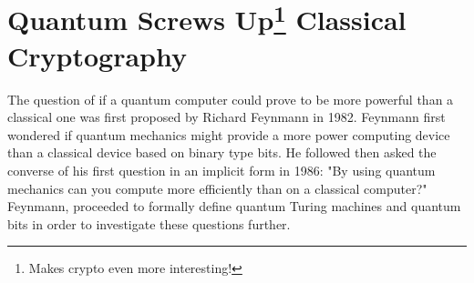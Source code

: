 \section{Quantum Screws Up\footnote{Makes crypto even more interesting!} Classical Cryptography} 


The question of if a quantum computer could prove to be more powerful than a classical one was first proposed by Richard Feynmann in 1982. Feynmann first wondered if quantum mechanics might provide a more power computing device than a classical device based on binary type bits. He followed then asked the converse of his first question in an implicit form in 1986: "By using quantum mechanics can you compute more efficiently than on a classical computer?" Feynmann, proceeded to formally define quantum Turing machines and quantum bits in order to investigate these questions further.






